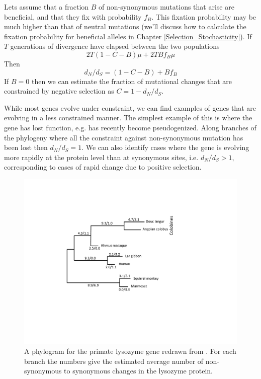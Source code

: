 Lets assume that a fraction $B$ of non-synonymous mutations that arise are
beneficial, and that they fix with probability $f_B$. This fixation
probability may be much higher than that of neutral mutations (we'll
discuss how to calculate the fixation probability for beneficial
alleles in Chapter \ref{Selection_Stochasticity}).  If $T$ generations of divergence have
elapsed between the two populations 
\begin{equation}
2T (1-C - B) \mu  + 2T B f_B \mu
\end{equation}
Then
\begin{equation} 
d_N/d_S  = (1-C-B) +  B f_B
\end{equation}
If $B=0$ then we can estimate the fraction of mutational changes that
are constrained by negative selection as $C= 1- d_N/d_S$. 

While most genes evolve under constraint, we can find examples of
genes that are evolving in a less constrained manner. The simplest
example of this is where the gene has lost function, e.g. has recently
become pseudogenized. Along branches of the phylogeny where all the
constraint against non-synonymous mutation has
been lost then $d_N/d_S=1$. We can also identify cases where the gene
is evolving more rapidly at the protein level than at synonymous
sites, i.e. $d_N/d_S > 1$, corresponding to cases of rapid change due
to positive selection. 

\begin{figure}
\begin{center}
\includegraphics[width=0.8 \textwidth]{Journal_figs/genetic_drift/Yang_lysozyme/Yang_lysozyme.pdf}
\end{center}
\caption{A phylogram for the primate lysozyme gene redrawn from
  \citeauthor{Yang:98}. For each branch the numbers give the estimated average
number of non-synonymous to synonymous changes in the lysozyme protein.} \label{fig:lysozyme}  
\end{figure} 

